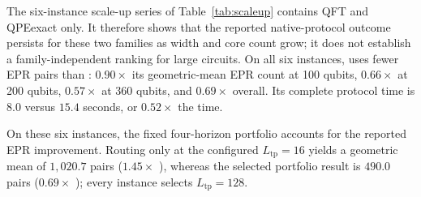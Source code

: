 \begin{table}[t]
\centering
\caption{Scale-up results under native protocols. The $5{\times}5$-core
architectures grow from 6 to 20 cores, read from \dSABRE{}'s own device
files; our \dSABRE{} column reproduces its published
series~\cite{lidsabre}. $t$ is complete
protocol time. \PORTER{} selects $L_\mathrm{tp}=128$ for every instance.}
\label{tab:scaleup}
\setlength{\tabcolsep}{5pt}
\small
{}
\end{table}

The six-instance scale-up series of Table~\ref{tab:scaleup} contains QFT
and QPEexact only. It
therefore shows that the reported native-protocol outcome persists for these
two families as width and core count grow; it does not establish a
family-independent ranking for large circuits. On all six instances,
\PORTER{} uses fewer EPR pairs than \dSABRE{}: $0.90\times$ its
geometric-mean EPR count at 100 qubits, $0.66\times$ at 200 qubits,
$0.57\times$ at 360 qubits, and $0.69\times$ overall. Its complete
protocol time is $8.0$ versus $15.4$ seconds, or $0.52\times$ the \dSABRE{}
time.

On these six instances, the fixed four-horizon portfolio accounts for the
reported EPR improvement. Routing only at the configured
$L_\mathrm{tp}=16$ yields a geometric mean of $1{,}020.7$ pairs
($1.45\times$ \dSABRE{}), whereas the selected portfolio result is $490.0$
pairs ($0.69\times$ \dSABRE{}); every instance selects
$L_\mathrm{tp}=128$.

